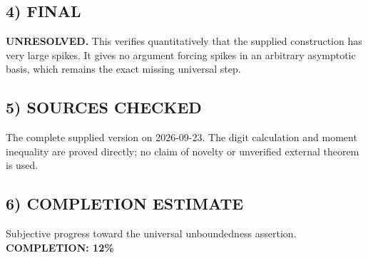 \subsection*{4) FINAL}
\textbf{UNRESOLVED.} This verifies quantitatively that the supplied construction has very large spikes. It gives no argument forcing spikes in an arbitrary asymptotic basis, which remains the exact missing universal step.
\subsection*{5) SOURCES CHECKED}
The complete supplied version on 2026-09-23. The digit calculation and moment inequality are proved directly; no claim of novelty or unverified external theorem is used.
\subsection*{6) COMPLETION ESTIMATE}
Subjective progress toward the universal unboundedness assertion.
\textbf{COMPLETION: 12\%}
